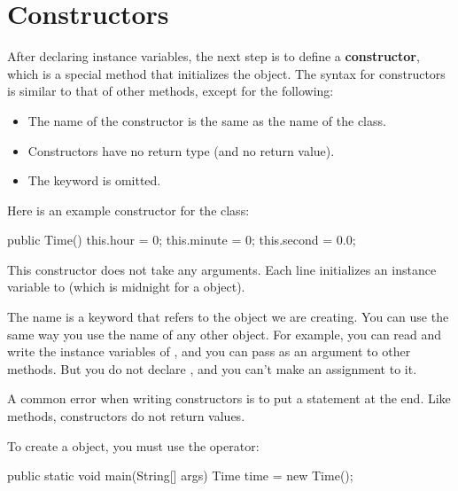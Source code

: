 \section{Constructors}


After declaring instance variables, the next step is to define a {\bf constructor}, which is a special method that initializes the object.
The syntax for constructors is similar to that of other methods, except for the following:


\begin{itemize}

\item The name of the constructor is the same as the name of the class.

\item Constructors have no return type (and no return value).

\item The keyword  is omitted.

\end{itemize}

Here is an example constructor for the  class:

\begin{code}
public Time() {
    this.hour = 0;
    this.minute = 0;
    this.second = 0.0;
}
\end{code}

This constructor does not take any arguments.
Each line initializes an instance variable to  (which is midnight for a  object).


The name  is a keyword that refers to the object we are creating.
You can use  the same way you use the name of any other object.
For example, you can read and write the instance variables of , and you can pass  as an argument to other methods.
But you do not declare , and you can't make an assignment to it.

A common error when writing constructors is to put a  statement at the end.
Like  methods, constructors do not return values.

To create a  object, you must use the  operator:

\begin{code}
public static void main(String[] args) {
    Time time = new Time();
}
\end{code}


